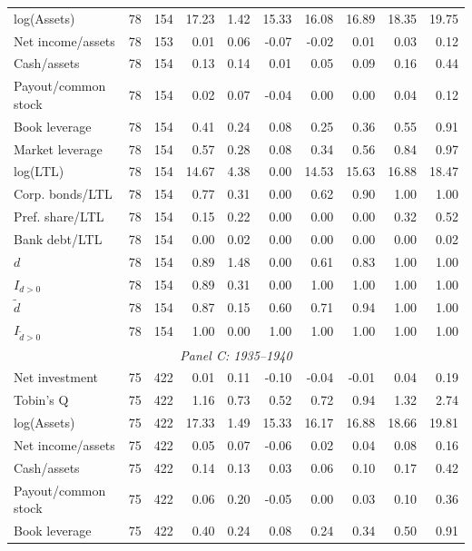 \begin{threeparttable}
\begin{tabular}{lrrrrrrrrr}
log(Assets) & 78 & 154 & 17.23 & 1.42 & 15.33 & 16.08 & 16.89 & 18.35 & 19.75 \\
Net income/assets & 78 & 153 & 0.01 & 0.06 & -0.07 & -0.02 & 0.01 & 0.03 & 0.12 \\
Cash/assets & 78 & 154 & 0.13 & 0.14 & 0.01 & 0.05 & 0.09 & 0.16 & 0.44 \\
Payout/common stock & 78 & 154 & 0.02 & 0.07 & -0.04 & 0.00 & 0.00 & 0.04 & 0.12 \\
Book leverage & 78 & 154 & 0.41 & 0.24 & 0.08 & 0.25 & 0.36 & 0.55 & 0.91 \\
Market leverage & 78 & 154 & 0.57 & 0.28 & 0.08 & 0.34 & 0.56 & 0.84 & 0.97 \\
log(LTL) & 78 & 154 & 14.67 & 4.38 & 0.00 & 14.53 & 15.63 & 16.88 & 18.47 \\
Corp. bonds/LTL & 78 & 154 & 0.77 & 0.31 & 0.00 & 0.62 & 0.90 & 1.00 & 1.00 \\
Pref. share/LTL & 78 & 154 & 0.15 & 0.22 & 0.00 & 0.00 & 0.00 & 0.32 & 0.52 \\
Bank debt/LTL & 78 & 154 & 0.00 & 0.02 & 0.00 & 0.00 & 0.00 & 0.00 & 0.02 \\
\ensuremath{d} & 78 & 154 & 0.89 & 1.48 & 0.00 & 0.61 & 0.83 & 1.00 & 1.00 \\
\ensuremath{I_{d>0}} & 78 & 154 & 0.89 & 0.31 & 0.00 & 1.00 & 1.00 & 1.00 & 1.00 \\
\ensuremath{\tilde{d}} & 78 & 154 & 0.87 & 0.15 & 0.60 & 0.71 & 0.94 & 1.00 & 1.00 \\
\ensuremath{I_{\tilde{d}>0}} & 78 & 154 & 1.00 & 0.00 & 1.00 & 1.00 & 1.00 & 1.00 & 1.00 \\
\midrule
\multicolumn{10}{c}{\textit{Panel C: 1935--1940}} \\
\midrule
Net investment & 75 & 422 & 0.01 & 0.11 & -0.10 & -0.04 & -0.01 & 0.04 & 0.19 \\
Tobin's Q & 75 & 422 & 1.16 & 0.73 & 0.52 & 0.72 & 0.94 & 1.32 & 2.74 \\
log(Assets) & 75 & 422 & 17.33 & 1.49 & 15.33 & 16.17 & 16.88 & 18.66 & 19.81 \\
Net income/assets & 75 & 422 & 0.05 & 0.07 & -0.06 & 0.02 & 0.04 & 0.08 & 0.16 \\
Cash/assets & 75 & 422 & 0.14 & 0.13 & 0.03 & 0.06 & 0.10 & 0.17 & 0.42 \\
Payout/common stock & 75 & 422 & 0.06 & 0.20 & -0.05 & 0.00 & 0.03 & 0.10 & 0.36 \\
Book leverage & 75 & 422 & 0.40 & 0.24 & 0.08 & 0.24 & 0.34 & 0.50 & 0.91 \\

\end{tabular}
\end{threeparttable}
